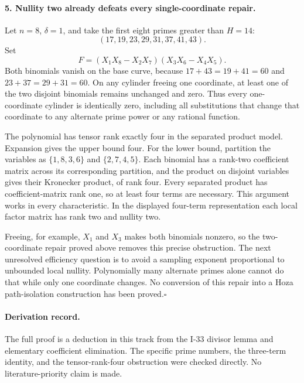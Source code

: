 \paragraph{5. Nullity two already defeats every single-coordinate repair.}
Let $n=8$, $\delta=1$, and take the first eight primes
greater than $H=14$:
\[
 (17,19,23,29,31,37,41,43).
\]
Set
\[
 F=(X_1X_8-X_2X_7)(X_3X_6-X_4X_5).
\]
Both binomials vanish on the base curve, because
$17+43=19+41=60$ and $23+37=29+31=60$.
On any cylinder freeing one coordinate, at least one of
the two disjoint binomials remains unchanged and zero.
Thus every one-coordinate cylinder is identically zero,
including all substitutions that change that coordinate
to any alternate prime power or any rational function.

The polynomial has tensor rank exactly four in the separated
product model. Expansion gives the upper bound four. For
the lower bound, partition the variables as
$\{1,8,3,6\}$ and $\{2,7,4,5\}$.
Each binomial has a rank-two coefficient matrix across its
corresponding partition, and the product on disjoint
variables gives their Kronecker product, of rank four.
Every separated product has coefficient-matrix rank one,
so at least four terms are necessary. This argument works
in every characteristic. In the displayed four-term
representation each local factor matrix has rank two and
nullity two.

Freeing, for example, $X_1$ and $X_3$ makes both binomials
nonzero, so the two-coordinate repair proved above removes
this precise obstruction. The next unresolved efficiency
question is to avoid a sampling exponent proportional to
unbounded local nullity. Polynomially many alternate primes
alone cannot do that while only one coordinate changes.
No conversion of this repair into a Hoza path-isolation
construction has been proved.\hfill$\square$

\paragraph{Derivation record.}
The full proof is a deduction in this track from the I-33
divisor lemma and elementary coefficient elimination.
The specific prime numbers, the three-term identity, and
the tensor-rank-four obstruction were checked directly.
No literature-priority claim is made.
